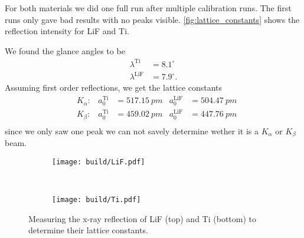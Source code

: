 For both materials we did one full run after multiple calibration runs. The first runs only gave bad
results with no peaks visible. \autoref{fig:lattice_constants} shows the reflection intensity for
LiF and Ti.

We found the glance angles to be
\begin{align}
  \lambda^\text{Ti} &= 8.1^\circ \\
  \lambda^\text{LiF} &= 7.9^\circ.
\end{align}
Assuming first order reflections, we get the lattice constants
\begin{align}
  &K_\alpha: & a_0^\text{Ti} &= \SI{517.15}{pm} & a_0^\text{LiF} &= \SI{504.47}{pm} \\
  &K_\beta: & a_0^\text{Ti} &= \SI{459.02}{pm} & a_0^\text{LiF} &= \SI{447.76}{pm} \\
\end{align}
since we only saw one peak we can not savely determine wether it is a $K_\alpha$ or $K_\beta$ beam.

\begin{figure}
  \centering
  \begin{subfigure}[b]{0.45\textwidth}
    \centering
    \texttt{[image: build/LiF.pdf]}
    \label{fig:lif}
  \end{subfigure}
  \\
  \begin{subfigure}[b]{0.45\textwidth}
    \centering
    \texttt{[image: build/Ti.pdf]}
    \label{fig:ti}
  \end{subfigure}
  \caption{Measuring the x-ray reflection of LiF (top) and Ti (bottom) to
  determine their lattice constants.}
  \label{fig:lattice_constants}
\end{figure}
